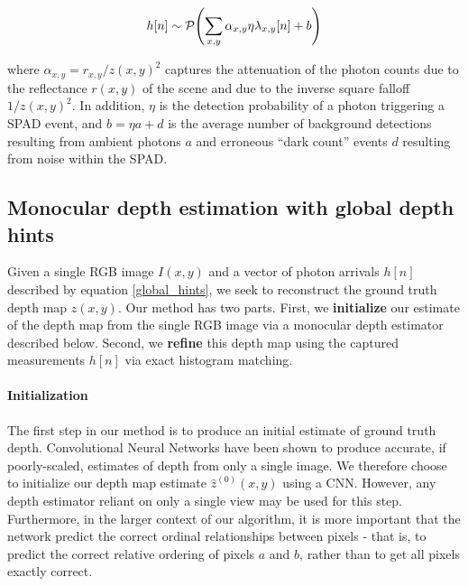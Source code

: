 \begin{equation}
  h[n] \sim \mathcal{P}\paren*{\sum_{x,y}\alpha_{x,y}\eta \lambda_{x,y}[n] + b} \label{global_hints}
\end{equation}

where $\alpha_{x,y} = r_{x,y}/z(x,y)^2$ captures the attenuation of the
photon counts due to the reflectance $r(x,y)$ of the scene and due to the
inverse square falloff $1/z(x,y)^2$.
In addition, $\eta$ is the detection probability of a photon
triggering a SPAD event, and $b = \eta a + d$ is the average number of background detections resulting
from ambient photons $a$
and erroneous ``dark count'' events $d$ resulting from noise within the SPAD.

\subsection{Monocular depth estimation with global depth hints}
Given a single RGB image $I(x,y)$ and a vector of photon arrivals $h[n]$
described by equation \ref{global_hints}, we seek to
reconstruct the ground truth depth map $z(x,y)$.
Our method has two parts. First, we \textbf{initialize} our estimate of the depth map from the single RGB
image via a monocular depth estimator described below. Second, we \textbf{refine} this depth map using
the captured measurements $h[n]$ via exact histogram matching. 

\paragraph{Initialization}
The first step in our method is to produce an initial estimate of ground truth
depth. Convolutional Neural Networks have been shown to produce accurate, if poorly-scaled, estimates of depth
from only a single image. We therefore choose to initialize our depth map
estimate $\hat z^{(0)}(x,y)$ using
a CNN. However, any depth estimator reliant on only a single
view may be used for this step. Furthermore, in the larger context of our
algorithm, it is more important that the network predict the correct ordinal
relationships between pixels - that is, to predict the correct relative ordering
of pixels $a$ and $b$, rather than to get all pixels exactly correct.


